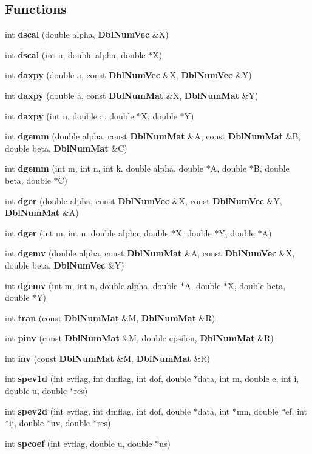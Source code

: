 \subsection*{Functions}
\begin{CompactItemize}
\item 
int {\bf dscal} (double alpha, {\bf Dbl\-Num\-Vec} \&X)
\item 
int {\bf dscal} (int n, double alpha, double $\ast$X)
\item 
int {\bf daxpy} (double a, const {\bf Dbl\-Num\-Vec} \&X, {\bf Dbl\-Num\-Vec} \&Y)
\item 
int {\bf daxpy} (double a, const {\bf Dbl\-Num\-Mat} \&X, {\bf Dbl\-Num\-Mat} \&Y)
\item 
int {\bf daxpy} (int n, double a, double $\ast$X, double $\ast$Y)
\item 
int {\bf dgemm} (double alpha, const {\bf Dbl\-Num\-Mat} \&A, const {\bf Dbl\-Num\-Mat} \&B, double beta, {\bf Dbl\-Num\-Mat} \&C)
\item 
int {\bf dgemm} (int m, int n, int k, double alpha, double $\ast$A, double $\ast$B, double beta, double $\ast$C)
\item 
int {\bf dger} (double alpha, const {\bf Dbl\-Num\-Vec} \&X, const {\bf Dbl\-Num\-Vec} \&Y, {\bf Dbl\-Num\-Mat} \&A)
\item 
int {\bf dger} (int m, int n, double alpha, double $\ast$X, double $\ast$Y, double $\ast$A)
\item 
int {\bf dgemv} (double alpha, const {\bf Dbl\-Num\-Mat} \&A, const {\bf Dbl\-Num\-Vec} \&X, double beta, {\bf Dbl\-Num\-Vec} \&Y)
\item 
int {\bf dgemv} (int m, int n, double alpha, double $\ast$A, double $\ast$X, double beta, double $\ast$Y)
\item 
int {\bf tran} (const {\bf Dbl\-Num\-Mat} \&M, {\bf Dbl\-Num\-Mat} \&R)
\item 
int {\bf pinv} (const {\bf Dbl\-Num\-Mat} \&M, double epsilon, {\bf Dbl\-Num\-Mat} \&R)
\item 
int {\bf inv} (const {\bf Dbl\-Num\-Mat} \&M, {\bf Dbl\-Num\-Mat} \&R)
\item 
int {\bf spev1d} (int evflag, int dmflag, int dof, double $\ast$data, int m, double e, int i, double u, double $\ast$res)
\item 
int {\bf spev2d} (int evflag, int dmflag, int dof, double $\ast$data, int $\ast$mn, double $\ast$ef, int $\ast$ij, double $\ast$uv, double $\ast$res)
\item 
int {\bf spcoef} (int evflag, double u, double $\ast$us)

\end{CompactItemize}
